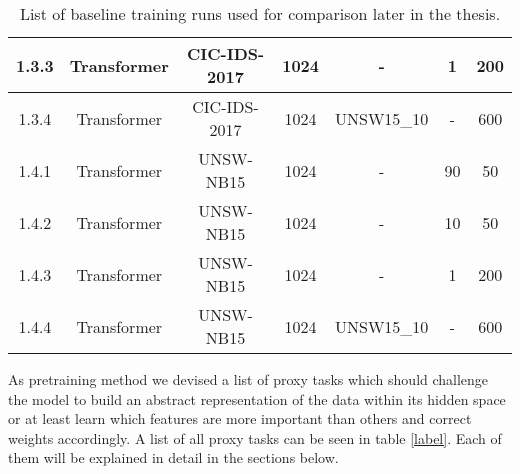 \begin{table}[h]
{\begin{tabular}{c c c c c c c}
			1.3.3 \label{ex_1_2_3}           & Transformer    & CIC-IDS-2017     & 1024                                     & -			& 1                    & 200                                           \\ \midrule
			1.3.4 \label{ex_1_2_4}           & Transformer    & CIC-IDS-2017     & 1024                                     & UNSW15\_10	& -                    & 600                                           \\ \midrule
			1.4.1 \label{ex_1_2_5}           & Transformer    & UNSW-NB15        & 1024                                     & -			& 90                   & 50                                            \\ \midrule
			1.4.2 \label{ex_1_2_6}           & Transformer    & UNSW-NB15        & 1024                                     & -			& 10                   & 50                                            \\ \midrule
			1.4.3 \label{ex_1_2_7}           & Transformer    & UNSW-NB15        & 1024                                     & -			& 1                    & 200                                           \\ \midrule
			1.4.4 \label{ex_1_2_8}           & Transformer    & UNSW-NB15        & 1024                                     & UNSW15\_10	& -                    & 600                                           \\
	\end{tabular}}
	\caption{List of baseline training runs used for comparison later in the thesis.}
	\label{table:experiments:baseline}
\end{table}

As pretraining method we devised a list of proxy tasks which should challenge the model to build an abstract representation of the data within its hidden space or at least learn which features are more important than others and correct weights accordingly. A list of all proxy tasks can be seen in table \ref{label}. Each of them will be explained in detail in the sections below.

